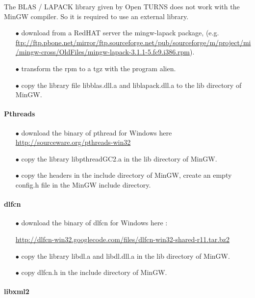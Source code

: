 \documentclass[11pt]{article}
\begin{document}
The BLAS / LAPACK library given by Open TURNS does not work with the MinGW compiler. So it is required to use an external library.

\begin{itemize}
\item[$\bullet$] download from a RedHAT server the mingw-lapack package, (e.g. \url{ftp://ftp.pbone.net/mirror/ftp.sourceforge.net/pub/sourceforge/m/project/mi/mingw-cross/OldFiles/mingw-lapack-3.1.1-5.fc9.i386.rpm}).
\item[$\bullet$]  transform the rpm to a tgz with the program alien.
\item[$\bullet$]  copy the library file  libblas.dll.a and liblapack.dll.a to the lib directory of MinGW.
\end{itemize}


\paragraph{Pthreads\label{pthread-installation}}

\begin{itemize}
\item[$\bullet$]  download the binary of pthread for Windows here \url{http://sourceware.org/pthreads-win32}
\item[$\bullet$]  copy the library libpthreadGC2.a in the lib directory of MinGW.
\item[$\bullet$]  copy the headers in the include directory of MinGW, create an empty config.h file in the MinGW include directory.
\end{itemize}


\paragraph{dlfcn}

\begin{itemize}
\item[$\bullet$]  download the binary of dlfcn for Windows here :

  \url{http://dlfcn-win32.googlecode.com/files/dlfcn-win32-shared-r11.tar.bz2}

\item[$\bullet$]  copy the library libdl.a and libdl.dll.a in the lib directory of MinGW.
\item[$\bullet$]  copy dlfcn.h in the include directory of MinGW.
\end{itemize}

\paragraph{libxml2}
\end{document}
